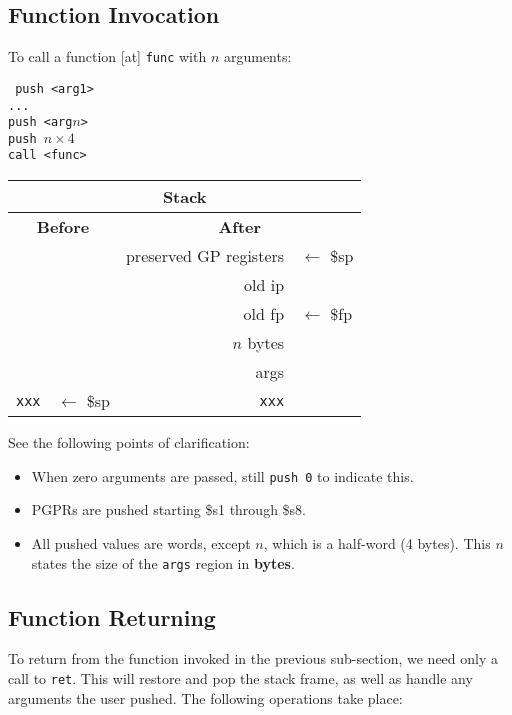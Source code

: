 \documentclass[10pt]{article}
\begin{document}
\subsection{Function Invocation}

To call a function [at] \texttt{func} with \(n\) arguments:

\medskip
\texttt{%
push <arg1>\\%
...\\%
push <arg\(n\)>\\%
push \(n \times 4\)\\%
call <func>
}

\medskip
\begin{tabular}{|r l||r l|}
     \hline
     \multicolumn{4}{|c|}{\textbf{Stack}} \\
     \hline
     \multicolumn{2}{|c||}{\textbf{Before}} & \multicolumn{2}{c|}{\textbf{After}} \\
     \hline
     & & preserved GP registers & \(\leftarrow\) \$sp \\
     & & old ip & \\
     & & old fp & \(\leftarrow\) \$fp \\
     & & \(n\) bytes & \\
     & & args & \\
     \texttt{xxx} & \(\leftarrow\) \$sp & \texttt{xxx} & \\
     \hline
\end{tabular}
\medskip

See the following points of clarification:
\begin{itemize}
    \item When zero arguments are passed, still \texttt{push 0} to indicate this.
    \item PGPRs are pushed starting \$s1 through \$s8.
    \item All pushed values are words, except \(n\), which is a half-word (4 bytes).
    This \(n\) states the size of the \texttt{args} region in \textbf{bytes}.
\end{itemize}

\subsection{Function Returning}

To return from the function invoked in the previous sub-section, we need only a call to \texttt{ret}.
This will restore and pop the stack frame, as well as handle any arguments the user pushed.
The following operations take place:
\end{document}
